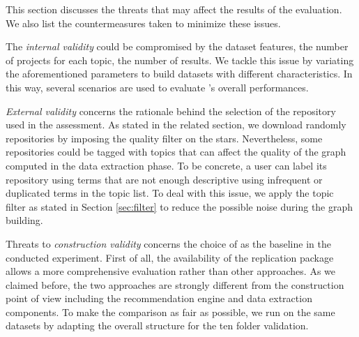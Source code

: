 
This section discusses the threats that may affect the results of the evaluation. We also list the countermeasures taken to minimize these issues.

The \emph{internal validity} could be compromised by the dataset features, \ie the number of projects for each topic, the number of results. We tackle this issue by variating the aforementioned parameters to build datasets with different characteristics. In this way, several scenarios are used to evaluate \TF's overall performances.

\emph{External validity} concerns the rationale behind the selection of the \GH repository used in the assessment. As stated in the related section, we download randomly repositories by imposing the quality filter on the stars. Nevertheless, some repositories could be tagged with topics that can affect the quality of the graph computed in the data extraction phase. To be concrete, a user can label its repository using terms that are not enough descriptive \ie using infrequent or duplicated terms in the topic list. To deal with this issue, we apply the topic filter as stated in Section \ref{sec:filter} to reduce the possible noise during the graph building.

Threats to \emph{construction validity} concerns the choice of \MNB as the baseline in the conducted experiment. First of all, the availability of the replication package allows a more comprehensive evaluation rather than other approaches. As we claimed before, the two approaches are strongly different from the construction point of view including the recommendation engine and data extraction components. To make the comparison as fair as possible, we run \MNB on the same datasets by adapting the overall structure for the ten folder validation.